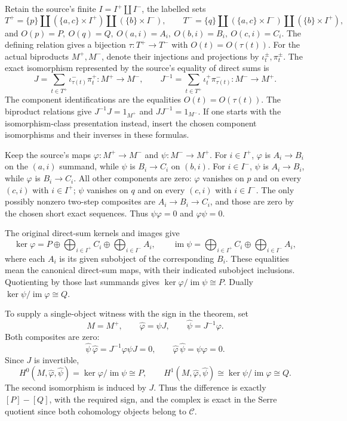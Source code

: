 \documentclass[11pt]{article}
\begin{document}
Retain the source's finite \(I=I^+\amalg I^-\), the labelled sets \[
T^+=\{p\}\amalg(\{a,c\}\times I^+)\amalg(\{b\}\times I^-),\qquad
T^-=\{q\}\amalg(\{a,c\}\times I^-)\amalg(\{b\}\times I^+),
\] and \(O(p)=P,\ O(q)=Q,\ O(a,i)=A_i,\ O(b,i)=B_i,\ O(c,i)=C_i\). The defining relation gives a bijection \(\tau:T^+\to T^-\) with \(O(t)=O(\tau(t))\). For the actual biproducts \(M^+,M^-\), denote their injections and projections by \(\iota_t^\pm,\pi_t^\pm\). The exact isomorphism represented by the source's equality of direct sums is \[
J=\sum_{t\in T^+}\iota_{\tau(t)}^-\pi_t^+:M^+\to M^-,
\qquad
J^{-1}=\sum_{t\in T^+}\iota_t^+\pi_{\tau(t)}^-:M^-\to M^+.
\] The component identifications are the equalities \(O(t)=O(\tau(t))\). The biproduct relations give \(J^{-1}J=1_{M^+}\) and \(JJ^{-1}=1_{M^-}\). If one starts with the isomorphism-class presentation instead, insert the chosen component isomorphisms and their inverses in these formulas.

Keep the source's maps \(\varphi:M^+\to M^-\) and \(\psi:M^-\to M^+\). For \(i\in I^+\), \(\varphi\) is \(A_i\to B_i\) on the \((a,i)\) summand, while \(\psi\) is \(B_i\to C_i\) on \((b,i)\). For \(i\in I^-\), \(\psi\) is \(A_i\to B_i\), while \(\varphi\) is \(B_i\to C_i\). All other components are zero: \(\varphi\) vanishes on \(p\) and on every \((c,i)\) with \(i\in I^+\); \(\psi\) vanishes on \(q\) and on every \((c,i)\) with \(i\in I^-\). The only possibly nonzero two-step composites are \(A_i\to B_i\to C_i\), and those are zero by the chosen short exact sequences. Thus \(\psi\varphi=0\) and \(\varphi\psi=0\).

The original direct-sum kernels and images give \[
\ker\varphi
=P\oplus\bigoplus_{i\in I^+}C_i\oplus
 \bigoplus_{i\in I^-}A_i,\qquad
\operatorname{im}\psi
=\bigoplus_{i\in I^+}C_i\oplus\bigoplus_{i\in I^-}A_i,
\] where each \(A_i\) is its given subobject of the corresponding \(B_i\). These equalities mean the canonical direct-sum maps, with their indicated subobject inclusions. Quotienting by those last summands gives \(\ker\varphi/\operatorname{im}\psi\cong P\). Dually \(\ker\psi/\operatorname{im}\varphi\cong Q\).

To supply a single-object witness with the sign in the theorem, set \[
M=M^+,\qquad
\widehat\varphi=\psi J,\qquad
\widehat\psi=J^{-1}\varphi.
\] Both composites are zero: \[
\widehat\psi\,\widehat\varphi=J^{-1}\varphi\psi J=0,\qquad
\widehat\varphi\,\widehat\psi=\psi\varphi=0.
\] Since \(J\) is invertible, \[
H^0(M,\widehat\varphi,\widehat\psi)
=\ker\varphi/\operatorname{im}\psi\cong P,
\qquad
H^1(M,\widehat\varphi,\widehat\psi)
\cong\ker\psi/\operatorname{im}\varphi\cong Q.
\] The second isomorphism is induced by \(J\). Thus the difference is exactly \([P]-[Q]\), with the required sign, and the complex is exact in the Serre quotient since both cohomology objects belong to \(\mathcal C\).
\end{document}
